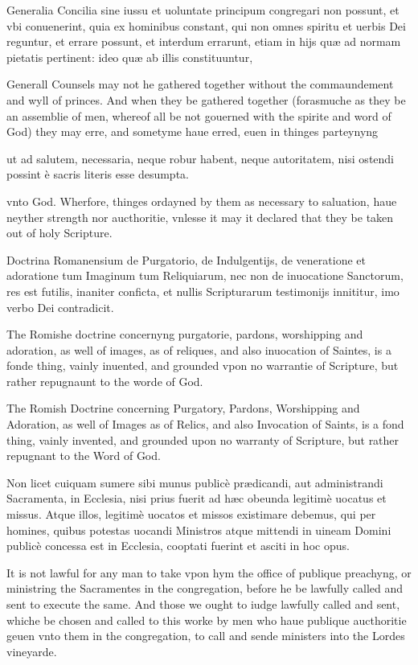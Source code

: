 Generalia Concilia sine iussu et uoluntate principum congregari non possunt, et vbi conuenerint, quia ex hominibus constant, qui non omnes spiritu et uerbis Dei reguntur, et errare possunt, et interdum errarunt, etiam in hijs quæ ad normam pietatis pertinent: ideo quæ ab illis constituuntur,

Generall Counsels may not he gathered together without the commaundement and wyll of princes. And when they be gathered together (forasmuche as they be an assemblie of men, whereof all be not gouerned with the spirite and word of God) they may erre, and sometyme haue erred, euen in thinges parteynyng

ut ad salutem, necessaria, neque robur habent, neque autoritatem, nisi ostendi possint è sacris literis esse desumpta.

vnto God. Wherfore, thinges ordayned by them as necessary to saluation, haue neyther strength nor aucthoritie, vnlesse it may it declared that they be taken out of holy Scripture.


Doctrina Romanensium de Purgatorio, de Indulgentijs, de veneratione et adoratione tum Imaginum tum Reliquiarum, nec non de inuocatione Sanctorum, res est futilis, inaniter conficta, et nullis Scripturarum testimonijs innititur, imo verbo Dei contradicit.

The Romishe doctrine concernyng purgatorie, pardons, worshipping and adoration, as well of images, as of reliques, and also inuocation of Saintes, is a fonde thing, vainly inuented, and grounded vpon no warrantie of Scripture, but rather repugnaunt to the worde of God.

The Romish Doctrine concerning Purgatory, Pardons, Worshipping and Adoration, as well of Images as of Relics, and also Invocation of Saints, is a fond thing, vainly invented, and grounded upon no warranty of Scripture, but rather repugnant to the Word of God.


Non licet cuiquam sumere sibi munus publicè prædicandi, aut administrandi Sacramenta, in Ecclesia, nisi prius fuerit ad hæc obeunda legitimè uocatus et missus. Atque illos, legitimè uocatos et missos existimare debemus, qui per homines, quibus potestas uocandi Ministros atque mittendi in uineam Domini publicè concessa est in Ecclesia, cooptati fuerint et asciti in hoc opus.

It is not lawful for any man to take vpon hym the office of publique preachyng, or ministring the Sacramentes in the congregation, before he be lawfully called and sent to execute the same. And those we ought to iudge lawfully called and sent, whiche be chosen and called to this worke by men who haue publique aucthoritie geuen vnto them in the congregation, to call and sende ministers into the Lordes vineyarde.


